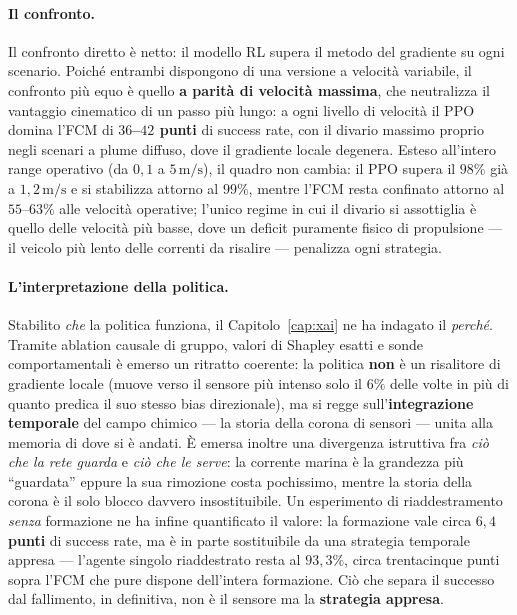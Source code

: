 \paragraph{Il confronto.}
Il confronto diretto \`e netto: il modello RL supera il metodo del gradiente su ogni scenario.
Poich\'e entrambi dispongono di una versione a velocit\`a variabile, il confronto pi\`u equo
\`e quello \textbf{a parit\`a di velocit\`a massima}, che neutralizza il vantaggio cinematico
di un passo pi\`u lungo: a ogni livello di velocit\`a il PPO domina l'FCM di
\textbf{$36$--$42$ punti} di success rate, con il divario massimo proprio negli scenari a
plume diffuso, dove il gradiente locale degenera. Esteso all'intero range operativo (da
$0{,}1$ a $5\,\text{m/s}$), il quadro non cambia: il PPO supera il $98\%$ gi\`a a
$1{,}2\,\text{m/s}$ e si stabilizza attorno al $99\%$, mentre l'FCM resta confinato attorno al
$55$--$63\%$ alle velocit\`a operative; l'unico regime in cui il divario si assottiglia \`e
quello delle velocit\`a pi\`u basse, dove un deficit puramente fisico di propulsione --- il
veicolo pi\`u lento delle correnti da risalire --- penalizza ogni strategia.

\paragraph{L'interpretazione della politica.}
Stabilito \emph{che} la politica funziona, il Capitolo~\ref{cap:xai} ne ha indagato il
\emph{perch\'e}. Tramite ablation causale di gruppo, valori di Shapley esatti e sonde
comportamentali \`e emerso un ritratto coerente: la politica \textbf{non} \`e un risalitore di
gradiente locale (muove verso il sensore pi\`u intenso solo il $6\%$ delle volte in pi\`u di
quanto predica il suo stesso bias direzionale), ma si regge sull'\textbf{integrazione
temporale} del campo chimico --- la storia della corona di sensori --- unita alla memoria di
dove si \`e andati. \`E emersa inoltre una divergenza istruttiva fra \emph{ci\`o che la rete
guarda} e \emph{ci\`o che le serve}: la corrente marina \`e la grandezza pi\`u ``guardata''
eppure la sua rimozione costa pochissimo, mentre la storia della corona \`e il solo blocco
davvero insostituibile. Un esperimento di riaddestramento \emph{senza} formazione ne ha
infine quantificato il valore: la formazione vale circa \textbf{$6{,}4$ punti} di success
rate, ma \`e in parte sostituibile da una strategia temporale appresa --- l'agente singolo
riaddestrato resta al $93{,}3\%$, circa trentacinque punti sopra l'FCM che pure dispone
dell'intera formazione. Ci\`o che separa il successo dal fallimento, in definitiva, non \`e il
sensore ma la \textbf{strategia appresa}.

